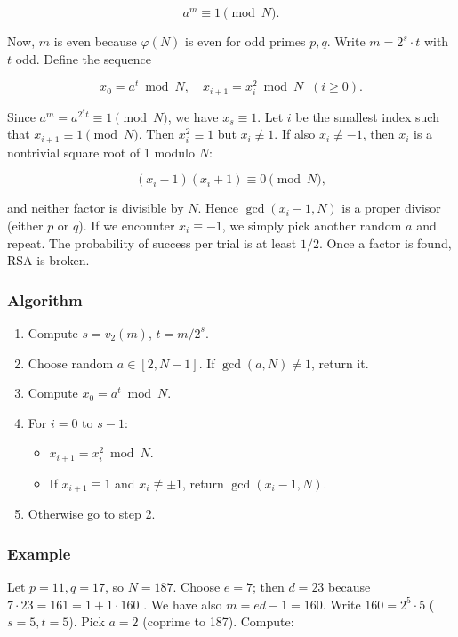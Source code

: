 \[
a^{m} \equiv 1 \pmod{N}. 
\]

Now, \(m\) is even because \(\varphi(N)\) is even for odd primes \(p,q\). Write \(m = 2^s \cdot t\) with \(t\) odd. Define the sequence  

\[
x_0 = a^{t} \bmod N,\quad x_{i+1} = x_i^{2} \bmod N\;\; (i \ge 0).
\]

Since \(a^{m} = a^{2^{s}t} \equiv 1 \pmod{N}\), we have \(x_s \equiv 1\). Let \(i\) be the smallest index such that \(x_{i+1} \equiv 1 \pmod{N}\). Then \(x_i^{2} \equiv 1\) but \(x_i \not\equiv 1\). If also \(x_i \not\equiv -1\), then \(x_i\) is a nontrivial square root of 1 modulo \(N\):  

\[
(x_i - 1)(x_i + 1) \equiv 0 \pmod{N},
\]

and neither factor is divisible by \(N\). Hence \(\gcd(x_i - 1, N)\) is a proper divisor (either \(p\) or \(q\)). If we encounter \(x_i \equiv -1\), we simply pick another random \(a\) and repeat. The probability of success per trial is at least \(1/2\). Once a factor is found, RSA is broken.

\subsubsection*{Algorithm}
\begin{enumerate}
\item Compute \(s = v_2(m)\), \(t = m / 2^s\).
\item Choose random \(a \in [2, N-1]\). If \(\gcd(a,N) \neq 1\), return it.
\item Compute \(x_0 = a^t \bmod N\).
\item For \(i = 0\) to \(s-1\):
   \begin{itemize}
   \item \(x_{i+1} = x_i^2 \bmod N\).
   \item If \(x_{i+1} \equiv 1\) and \(x_i \not\equiv \pm 1\), return \(\gcd(x_i-1, N)\).
   \end{itemize}
\item Otherwise go to step 2.
\end{enumerate}

\subsubsection*{Example}
Let \(p=11, q=17\), so \(N=187\). Choose \(e=7\); then \(d=23\) because \(7\cdot23 = 161 = 1 + 1\cdot160\) . We have also \(m = ed-1 = 160\). Write \(160 = 2^5 \cdot 5\) (\(s=5, t=5\)). Pick \(a=2\) (coprime to 187). Compute:

